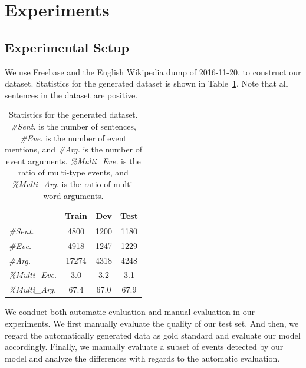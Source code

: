 \section{Experiments}
\subsection{Experimental Setup}
We use Freebase and the English Wikipedia dump of 2016-11-20, to construct our dataset. Statistics for the generated dataset is shown in Table~\ref{statistics}. Note that all sentences in the dataset are positive. 
\begin{table}
\small
\centering
\begin{tabular}{|l|c|c|c|} \hline
& Train & Dev & Test \\ \hline
\emph{\#Sent.} & 4800 & 1200 & 1180 \\ \hline
\emph{\#Eve.} & 4918 & 1247 & 1229 \\ \hline
\emph{\#Arg.} & 17274 & 4318 & 4248 \\ \hline
\emph{\%Multi\_Eve.} & 3.0 & 3.2 & 3.1 \\ \hline
\emph{\%Multi\_Arg.} & 67.4 & 67.0 & 67.9 \\ \hline
\end{tabular}	
\caption{Statistics for the generated dataset. \emph{\#Sent.} is the number of sentences, \emph{\#Eve.} is the number of event mentions, and \emph{\#Arg.} is the number of event arguments. \emph{\%Multi\_Eve.} is the ratio of multi-type events, and \emph{\%Multi\_Arg.} is the ratio of multi-word arguments.\label{statistics}}
\end{table}
We conduct both automatic evaluation and manual evaluation in our experiments. We first manually evaluate the quality of our test set. And then, we regard the automatically generated data as gold standard and evaluate our model accordingly. Finally, we manually evaluate a subset of events detected by our model and analyze the differences with regards to the automatic evaluation.

